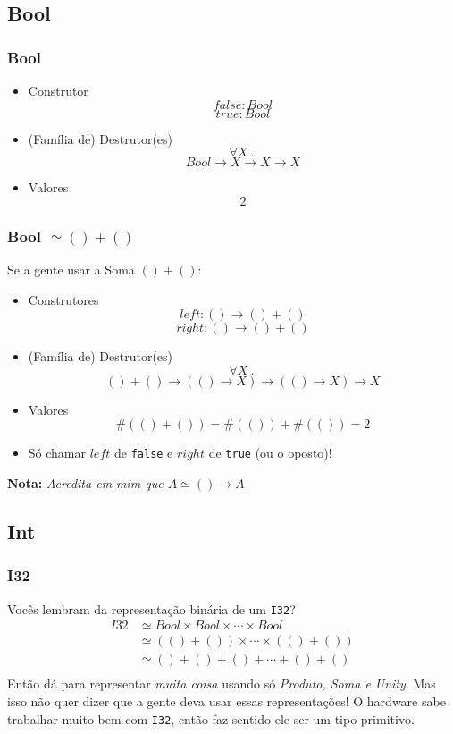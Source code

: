 \documentclass{beamer}
\newcommand{\inlcode}[1]{\texttt{#1}}
\newcommand{\nota}[1]{\textbf{Nota:}\textit{ #1}}
\renewcommand{\d}{\:.\:}
\newcommand{\typetam}{\#}
\newcommand{\typesim}{\simeq}
\begin{document}
\subsection{Bool}
\begin{frame}
    \frametitle{Bool}
    \begin{itemize}
        \item Construtor
            \[
                false : Bool
            \] \[
                true : Bool
            \]
            \vfill
        \item (Família de) Destrutor(es)
            \[
                \forall X \d
            \] \[
                Bool \to X \to X \to X
            \]
            \vfill
        \item Valores
            \[
                2
            \]
    \end{itemize}
\end{frame}

\begin{frame}
    \frametitle{Bool \(\typesim () + ()\)}
    Se a gente usar a Soma \(() + ()\):
    \vfill
    \begin{itemize}
        \item Construtores
            \[
                left : () \to () + ()
            \] \[
                right : () \to () + ()
            \]
            \vfill
        \item (Família de) Destrutor(es)
            \[
                \forall X \d
            \] \[
                () + () \to (() \to X) \to (() \to X) \to X
            \]
            \vfill
        \item Valores
            \[
                \typetam(() + ()) = \typetam(()) + \typetam(())
                = 2
            \]
            \vfill
        \item Só chamar \(left\) de \inlcode{false} e
            \(right\) de \inlcode{true} (ou o oposto)!
    \end{itemize}
    \vfill
    \nota{Acredita em mim que \(A \typesim () \to A\)}
\end{frame}

\subsection{Int}
\begin{frame}
    \frametitle{I32}
    Vocês lembram da representação binária de um \inlcode{I32}?
    \vfill
    \begin{align*}
        I32 &\typesim Bool \times Bool \times \cdots \times Bool \\
        &\typesim (()+()) \times \cdots \times (()+()) \\
        &\typesim () + () + () + \cdots + () + () \\
    \end{align*}
    \vfill
    Então dá para representar \emph{muita coisa} usando
    só \emph{Produto, Soma e Unity}.
    \vfill
    Mas isso não quer dizer que
    a gente deva usar essas representações!
    O hardware sabe trabalhar muito bem com \inlcode{I32},
    então faz sentido ele ser um tipo primitivo.
\end{frame}
\end{document}
